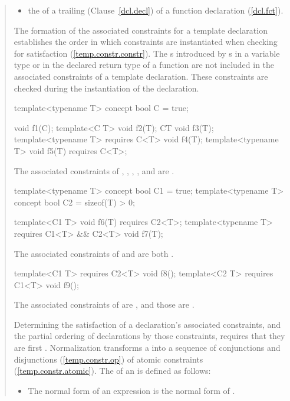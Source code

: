 \begin{quote}
\begin{addedblock}
\begin{itemize}
\begin{itemize}
\item the  of a trailing 
       (Clause~\ref{dcl.decl}) 
      of a function declaration (\ref{dcl.fct}).
\end{itemize}
\end{itemize}
% 
The formation of the associated constraints for a template declaration
establishes the order in which constraints are instantiated when checking 
for satisfaction (\ref{temp.constr.constr}).
% 
The s introduced by 
s in a variable type or in the 
declared return type of a function are not included in the associated 
constraints of a template declaration. 
% 
\enternote
These constraints are checked during the instantiation of the declaration.
\exitnote
% 
\enterexample
\begin{codeblock}
template<typename T> concept bool C = true;

void f1(C);
template<C T> void f2(T);
C{T} void f3(T);
template<typename T> requires C<T> void f4(T);
template<typename T> void f5(T) requires C<T>;
\end{codeblock}
The associated constraints of
, , , , and 
are .
% 
\begin{codeblock}
template<typename T> concept bool C1 = true;
template<typename T> concept bool C2 = sizeof(T) > 0;

template<C1 T> void f6(T) requires C2<T>;
template<typename T> requires C1<T> && C2<T> void f7(T);
\end{codeblock}
The associated constraints of  and  are both
.
% 
\begin{codeblock}
template<C1 T> requires C2<T> void f8();
template<C2 T> requires C1<T> void f9();
\end{codeblock}
% 
The associated constraints of  are
, and those  are
.
\exitexample

\pnum
Determining the satisfaction of a declaration's associated constraints,
and the partial ordering of declarations by those constraints,
requires that they are first .
% 
Normalization transforms a  into a sequence of 
conjunctions and disjunctions (\ref{temp.constr.op})
of atomic constraints (\ref{temp.constr.atomic}).
% 
The  of an   is 
defined as follows:
% 
\begin{itemize}
\item The normal form of an expression  is the normal form
of .


\end{itemize}
\end{addedblock}
\end{quote}

